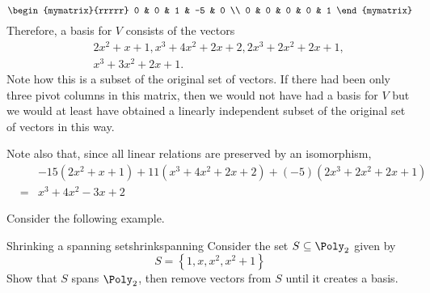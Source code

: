 \begin{solution}
\begin{equation*}
\begin{mymatrix}{rrrrr}
0 & 0 & 1 & -5 & 0 \\ 
0 & 0 & 0 & 0 & 1
\end{mymatrix}
\end{equation*}
Therefore, a basis for $V$ consists of the vectors
\begin{eqnarray*}
&&2x^{2}+x+1,x^{3}+4x^{2}+2x+2,2x^{3}+2x^{2}+2x+1, \\
&&x^{3}+3x^{2}+2x+1.
\end{eqnarray*}
Note how this is a subset of the original set of vectors. If there had been
only three pivot columns in this matrix, then we would not have had a basis
for $V$ but we would at least have obtained a linearly independent subset of
the original set of vectors in this way. 

Note also that, since all linear relations are preserved by an isomorphism,
\begin{eqnarray*}
&&-15\left( 2x^{2}+x+1\right) +11\left( x^{3}+4x^{2}+2x+2\right) +\left(
-5\right) \left( 2x^{3}+2x^{2}+2x+1\right) \\
&=&x^{3}+4x^{2}-3x+2
\end{eqnarray*}

\end{solution}

Consider the following example.

\begin{example}{Shrinking a spanning set}{shrinkspanning}
Consider the set $S \subseteq \Poly_2$ given by 
\[
S = \left\{ 1, x, x^2, x^2 + 1 \right\}
\]
Show that $S$ spans $\Poly_2$, then remove vectors from $S$ until it creates a basis. 
\end{example}


